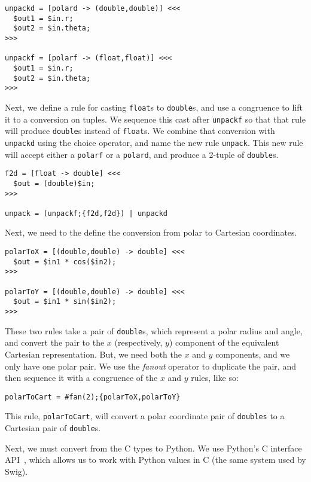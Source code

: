 \begin{verbatim}
unpackd = [polard -> (double,double)] <<<
  $out1 = $in.r;
  $out2 = $in.theta;
>>>

unpackf = [polarf -> (float,float)] <<<
  $out1 = $in.r;
  $out2 = $in.theta;
>>>
\end{verbatim}

Next, we define a rule for casting \texttt{float}s to \texttt{double}s, and use a congruence to lift it to a conversion on tuples. We sequence this cast after \texttt{unpackf} so that that rule will produce \texttt{double}s instead of \texttt{float}s. We combine that conversion with \texttt{unpackd} using the choice operator, and name the new rule \texttt{unpack}. This new rule will accept either a \texttt{polarf} or a \texttt{polard}, and produce a 2-tuple of \texttt{double}s.

\begin{verbatim}
f2d = [float -> double] <<<
  $out = (double)$in;
>>>

unpack = (unpackf;{f2d,f2d}) | unpackd
\end{verbatim}

Next, we need to the define the conversion from polar to Cartesian coordinates.

\begin{verbatim}
polarToX = [(double,double) -> double] <<<
  $out = $in1 * cos($in2);  
>>>

polarToY = [(double,double) -> double] <<<
  $out = $in1 * sin($in2);
>>>
\end{verbatim}

These two rules take a pair of \texttt{double}s, which represent a polar radius and angle, and convert the pair to the $x$ (respectively, $y$) component of the equivalent Cartesian representation. But, we need both the $x$ and $y$ components, and we only have one polar pair. We use the \emph{fanout} operator to duplicate the pair, and then sequence it with a congruence of the $x$ and $y$ rules, like so:

\begin{verbatim}
polarToCart = #fan(2);{polarToX,polarToY}
\end{verbatim}

This rule, \texttt{polarToCart}, will convert a polar coordinate pair of \texttt{doubles} to a Cartesian pair of \texttt{double}s.

Next, we must convert from the C types to Python. We use Python's C interface API~\cite{}, which allows us to work with Python values in C (the same system used by Swig).

